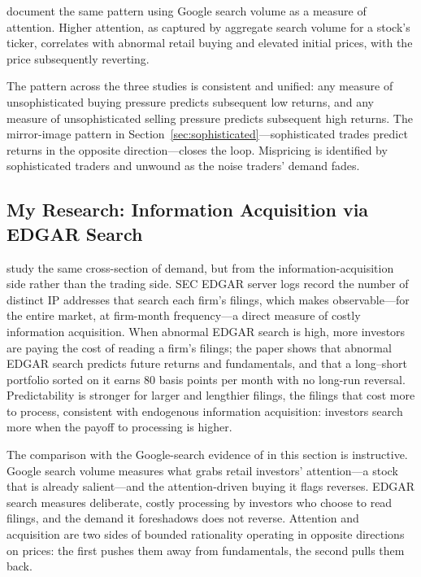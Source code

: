 \citet{daengelberggao2011} document the same pattern using Google search volume as a measure of attention. Higher attention, as captured by aggregate search volume for a stock's ticker, correlates with abnormal retail buying and elevated initial prices, with the price subsequently reverting.

The pattern across the three studies is consistent and unified: any measure of unsophisticated buying pressure predicts subsequent low returns, and any measure of unsophisticated selling pressure predicts subsequent high returns. The mirror-image pattern in Section~\ref{sec:sophisticated}---sophisticated trades predict returns in the opposite direction---closes the loop. Mispricing is identified by sophisticated traders and unwound as the noise traders' demand fades.

\subsection{My Research: Information Acquisition via EDGAR Search}

\citet{lisun2022} study the same cross-section of demand, but from the information-acquisition side rather than the trading side. SEC EDGAR server logs record the number of distinct IP addresses that search each firm's filings, which makes observable---for the entire market, at firm-month frequency---a direct measure of costly information acquisition. When abnormal EDGAR search is high, more investors are paying the cost of reading a firm's filings; the paper shows that abnormal EDGAR search predicts future returns and fundamentals, and that a long--short portfolio sorted on it earns 80 basis points per month with no long-run reversal. Predictability is stronger for larger and lengthier filings, the filings that cost more to process, consistent with endogenous information acquisition: investors search more when the payoff to processing is higher.

The comparison with the Google-search evidence of \citet{daengelberggao2011} in this section is instructive. Google search volume measures what grabs retail investors' attention---a stock that is already salient---and the attention-driven buying it flags reverses. EDGAR search measures deliberate, costly processing by investors who choose to read filings, and the demand it foreshadows does not reverse. Attention and acquisition are two sides of bounded rationality operating in opposite directions on prices: the first pushes them away from fundamentals, the second pulls them back.

